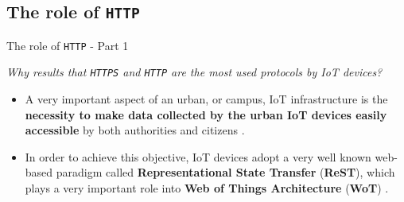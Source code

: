\documentclass[10pt]{beamer}
\begin{document}
\subsection{The role of \texttt{HTTP}}
\begin{frame}{The role of \texttt{HTTP} - Part 1}

\begin{alertblock}{}
\textit{Why results that \texttt{HTTPS} and \texttt{HTTP} are the most used protocols by IoT devices?}
\end{alertblock}

\begin{itemize}
\justifying
\item A very important aspect of an urban, or campus, IoT infrastructure is the \textbf{necessity to make data collected by the urban IoT devices easily accessible} by both authorities and citizens \cite{IOTCITY}.

\item In order to achieve this objective, IoT devices adopt a very well known web-based paradigm called  \textbf{Representational State Transfer} (\textbf{ReST}), which plays a very important role into \textbf{Web of Things Architecture} (\textbf{WoT}) \cite{IOTCITY}\cite{WOT}.

\end{itemize}


\end{frame} 
\end{document}
